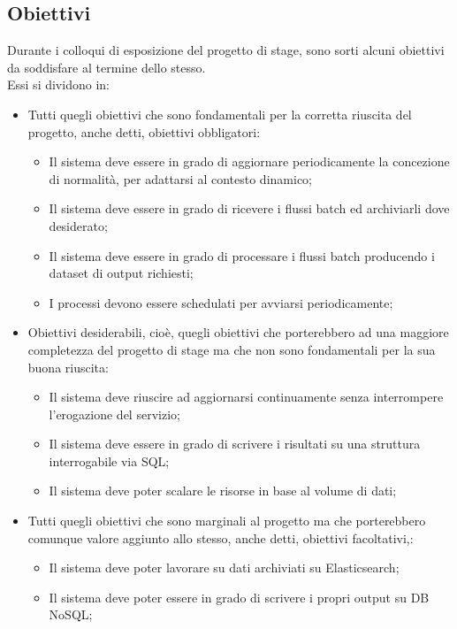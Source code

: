 \subsection{Obiettivi}
Durante i colloqui di esposizione del progetto di stage, sono sorti alcuni obiettivi da soddisfare al termine dello stesso.\\
Essi si dividono in:
\begin{itemize}
	\item Tutti quegli obiettivi che sono fondamentali per la corretta riuscita del progetto, anche detti, obiettivi obbligatori:
	\begin{itemize}
		\item Il sistema deve essere in grado di aggiornare periodicamente la concezione di normalità, per adattarsi al contesto dinamico;	 
		\item Il sistema deve essere in grado di ricevere i flussi batch ed archiviarli dove desiderato;
		\item Il sistema deve essere in grado di processare i flussi batch producendo i dataset di output richiesti;
		\item I processi devono essere schedulati per avviarsi periodicamente;
	\end{itemize}
	\item Obiettivi desiderabili, cioè, quegli obiettivi che porterebbero ad una maggiore completezza del progetto di stage ma che non sono fondamentali per la sua buona riuscita:
		\begin{itemize}
		 \item Il sistema deve riuscire ad aggiornarsi continuamente senza interrompere l'erogazione del servizio;
		 \item Il sistema deve essere in grado di scrivere i risultati su una struttura interrogabile via SQL;
		 \item Il sistema deve poter scalare le risorse in base al volume di dati;
		\end{itemize}	
	\item Tutti quegli obiettivi che sono marginali al progetto ma che porterebbero comunque valore aggiunto allo stesso, anche detti, obiettivi facoltativi,:
	\begin{itemize}
		\item Il sistema deve poter lavorare su dati archiviati su Elasticsearch;
		\item Il sistema deve poter essere in grado di scrivere i propri output su DB NoSQL; 
	\end{itemize}
\end{itemize}
